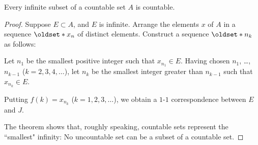 \begin{theorem}\label{theorem:2.1}
    Every infinite subset of a countable set \(A\) is countable.
\end{theorem}

\begin{proof}
    Suppose \(E\subset A\), and \(E\) is infinite. Arrange the elements \(x\) of \(A\) in a sequence \(\set{x_n}\) of distinct elements. Construct a sequence \(\set{n_k}\) as follows:
    
    Let \(n_1\) be the smallest positive integer such that \(x_{n_1}\in E\). Having chosen \(n_1\), \ldots, \(n_{k-1}\) (\(k=2,3,4,\ldots\)), let \(n_k\) be the smallest integer greater than \(n_{k-1}\) such that \(x_{n_k}\in E\).
    
    Putting \(f\left(k\right)=x_{n_k}\) (\(k=1,2,3,\ldots\)), we obtain a \(1\)-\(1\) correspondence between \(E\) and \(J\).
    
    The theorem shows that, roughly speaking, countable sets represent the ``smallest" infinity: No uncountable set can be a subset of a countable set.
\end{proof}

